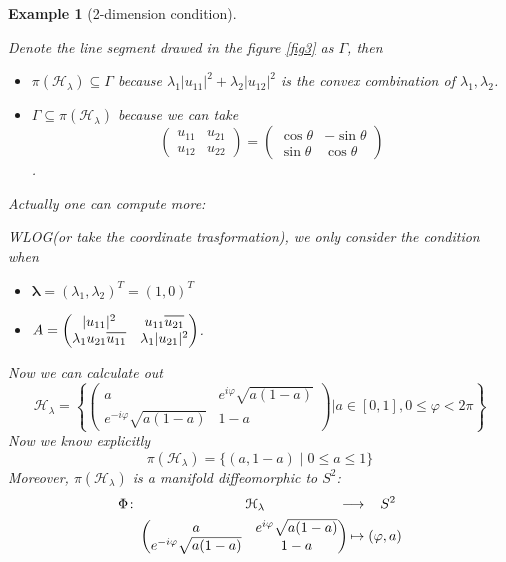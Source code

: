 \documentclass[11pt]{amsart}
\numberwithin{equation}{section}
\theoremstyle{plain}
\newtheorem{eg}[theorem]{Example}
\theoremstyle{plain}
\numberwithin{equation}{section}
\theoremstyle{remark}
\newcommand*\widebar[1]{%
	\hbox{%
		\vbox{%
			\hrule height 0.5pt %
			\kern0.6ex%
			\hbox{%
				\kern 0em%
				\ensuremath{#1}%
				\kern 0em%
			}%
		}%
	}%
}
\begin{document}
\begin{eg}[2-dimension condition]
\begin{figure}[th]
\begin{minipage}[t]{.49\textwidth}
		\caption{}
		\label{fig4}
	\end{minipage}
\end{figure}	
Denote the line segment drawed in the figure \ref{fig3} as $\Gamma$, then
\begin{itemize}
	\item $\pi (\mathcal{H}_\lambda) \subseteq \Gamma$ because 
	$\lambda_1|u_{11}|^2+\lambda_2 |u_{12}|^2$ is the convex combination of $\lambda_1, \lambda_2$.
	\item $\Gamma \subseteq \pi (\mathcal{H}_\lambda)$ because we can take
	$$\begin{pmatrix}
	 u_{11} &  u_{21} \\
	 u_{12} &  u_{22}
	\end{pmatrix}=
	\begin{pmatrix}
	\cos \theta & -\sin \theta \\
	\sin \theta & \cos \theta
	\end{pmatrix}$$.
\end{itemize}

	 Actually one can compute more:
	 
	WLOG(or take the coordinate trasformation), we only consider the condition when 
\begin{itemize}
	\item $\bm{\lambda} =(\lambda_1,\lambda_2)^T=(1,0)^T$ 
	\item 
	$A=\begin{pmatrix}
	|u_{11}|^2 & u_{11} \widebar{u_{21}} \\
	\lambda_1 u_{21} \widebar{u_{11}} & \lambda_1|u_{21}|^2
	\end{pmatrix}$.
\end{itemize}	
Now we can calculate out
$$\mathcal{H}_\lambda = \left\{ 
	\begin{pmatrix}
	a & e^{i\varphi} \sqrt{a(1-a)} \\
	e^{-i\varphi} \sqrt{a(1-a)} & 1-a
	\end{pmatrix} \bigg|a \in [0,1], 0 \leqslant \varphi <2\pi
	\right\} $$
Now we know explicitly
$$\pi (\mathcal{H}_\lambda)=\{(a,1-a) \mid 0\leqslant a \leqslant 1\}$$
Moreover, $\pi (\mathcal{H}_\lambda)$ is a manifold diffeomorphic to $S^2$:
\begin{equation*}
\begin{aligned}	
\Phi \colon &\hspace{2.7cm} \mathcal{H}_\lambda &\longrightarrow &\hspace{.4cm}  S^2 \\
&\begin{pmatrix}
a & e^{i\varphi} \sqrt{a(1-a)} \\
e^{-i\varphi} \sqrt{a(1-a)} & 1-a
\end{pmatrix}\hspace{-0.5cm} &\mapsto &\;(\varphi , a)
\end{aligned}
\end{equation*}

\end{eg}
\end{document}
